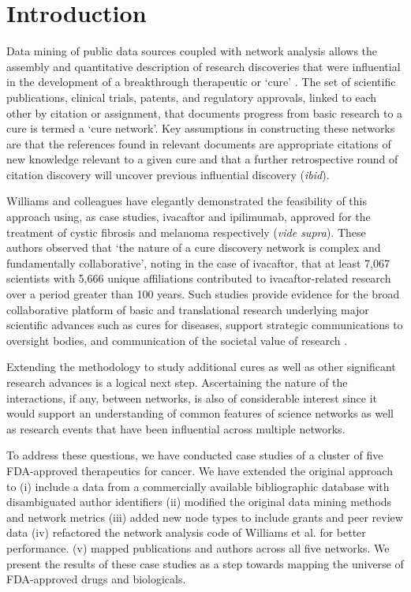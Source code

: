\documentclass[10pt,letterpaper]{article}
\begin{document}
\section*{Introduction}

Data mining of public data sources coupled with network analysis allows the assembly and quantitative description of research discoveries that were influential in the development of a breakthrough therapeutic or `cure' \cite {bib1}.  The set of scientific publications, clinical trials, patents, and regulatory approvals, linked to each other by citation or assignment, that documents progress from basic research to a cure is termed a `cure network'. Key assumptions in constructing these networks are that the references found in relevant documents are appropriate citations of new knowledge relevant to a given cure and that a further retrospective round of citation discovery will uncover previous influential discovery (\textit{ibid}). 

Williams and colleagues have elegantly demonstrated the feasibility of this approach using, as case studies, ivacaftor and ipilimumab, approved for the treatment of cystic fibrosis and melanoma respectively (\textit{vide supra}). These authors observed that `the nature of a cure discovery network is complex and fundamentally collaborative', noting in the case of ivacaftor, that at least 7,067 scientists with 5,666 unique affiliations contributed to ivacaftor-related research over a period greater than 100 years. Such studies provide evidence for the  broad collaborative platform of basic and translational research underlying major scientific advances such as cures for diseases, support strategic communications to oversight bodies, and communication of the societal value of research \cite {bib2}. 

Extending the methodology to study additional cures as well as other significant research advances is a logical next step. Ascertaining the nature of the interactions, if any, between networks, is also of considerable interest since it would support an understanding of common features of science networks as well as research events that have been influential across multiple networks. 

To address these questions, we have conducted case studies of a cluster of five FDA-approved therapeutics for cancer. We have extended the original approach to (i) include a data from a commercially available bibliographic database with disambiguated author identifiers (ii) modified the original data mining methods and network metrics (iii) added new node types to include grants and peer review data (iv) refactored the network analysis code of Williams et al. for better performance. (v) mapped publications and authors across all five networks. We present the results of these case studies as a step towards mapping the universe of FDA-approved drugs and biologicals.  
\end{document}
